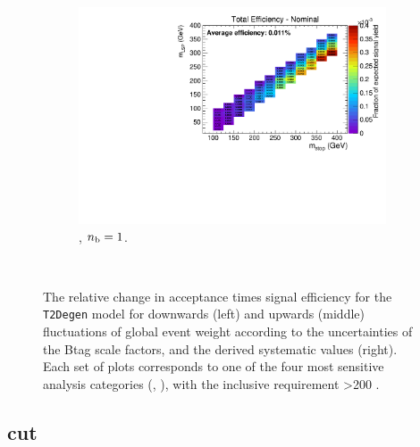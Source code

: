 \begin{figure}[ht!]
\begin{subfigure}[b]{0.32\textwidth}
    \includegraphics[width=\textwidth, page=6]{Figs/sms/t2degen/v5/bTag_T2_4body_v5_eq1b_ge4j_incl.pdf}
    \caption{\njhigh, $n_{\text{b}} = 1$.}
  \end{subfigure}\\
  \caption{The relative change in acceptance times signal efficiency for the
  \texttt{T2Degen} model for downwards (left) and upwards (middle) fluctuations
  of global event weight according to the uncertainties of the Btag scale 
  factors,
  and the derived systematic values (right). Each set of plots corresponds
  to one of the four most sensitive analysis categories (\nb, \nj), with the
  inclusive requirement \HT>200 \gev.}
  \label{fig:sms-btag-t2degen}
\end{figure}


\newpage
\subsection*{\mhtmet cut}
\label{sec:t2degen_mhtmet_plots}

